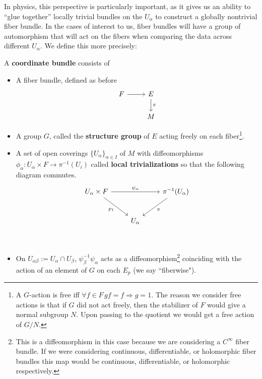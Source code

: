 	In physics, this perspective is particularly important, as it gives us an ability to ``glue together'' locally trivial bundles on the $U_\alpha$ to construct a globally nontrivial fiber bundle. In the cases of interest to us, fiber bundles will have a group of automorphism that will act on the fibers when comparing the data across different $U_\alpha$.
	We define this more precisely:
	\begin{defn}
		A \textbf{coordinate bundle} consists of 
		\begin{itemize}
			\item A fiber bundle, defined as before
			\[
			\begin{tikzcd}
				F \arrow[r] & E  \arrow[d,"\pi"] \\ 
				& M
			\end{tikzcd}
			\]
			\item A group $G$, called the \textbf{structure group} of $E$ acting freely on each fiber\footnote{A $G$-action is free iff $\forall f \in F \, g f = f  \Rightarrow g = 1$. The reason we consider free actions is that if $G$ did not act freely, then the stabilizer of $F$ would give a normal subgroup $N$. Upon passing to the quotient we would get a free action of $G/N$.}.
			\item A set of open coverings $\{ U_\alpha \}_{\alpha \in I}$ of $M$ with diffeomorphisms $\phi_\alpha: U_\alpha \times F \rightarrow \pi^{-1} (U_i)$ called \textbf{local trivializations} so that the following diagram commutes. 
			\[
			\begin{tikzcd}[row sep=2.5em]
			U_\alpha \times F \arrow[dr,swap,"p_1"] \arrow{rr}{\psi_\alpha} && \pi^{-1}(U_\alpha) \arrow{dl}{\pi} \\
			 & U_\alpha \\
			\end{tikzcd}
			\]
			\item On $U_{\alpha \beta} := U_\alpha \cap U_\beta$, $\psi_\beta^{-1} \psi_\alpha$ acts as a diffeomorphism\footnote{This is a diffeomorphism in this case because we are considering a $C^\infty$ fiber bundle. If we were considering continuous, differentiable, or holomorphic fiber bundles this map would be continuous, differentiable, or holomorphic respectively.} coinciding with the action of an element of $G$ on each $E_p$ (we say ``fiberwise"). 
		\end{itemize}
	\end{defn}
		
